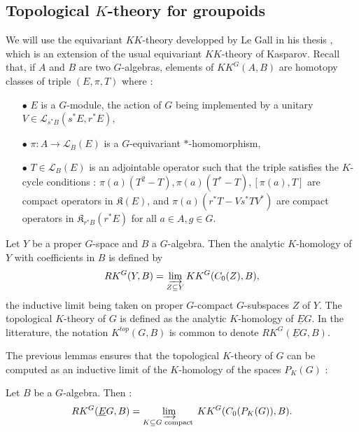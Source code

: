 \subsection{Topological $K$-theory for groupoids}

We will use the equivariant $KK$-theory developped by Le Gall in his thesis \cite{LeGall}, which is an extension of the usual equivariant $KK$-theory of Kasparov. Recall that, if $A$ and $B$ are two $G$-algebras, elements of $KK^G(A,B)$ are homotopy classes of triple $(E,\pi,T)$ where :\\

\begin{itemize}
\item[$\bullet$] $E$ is a $G$-module, the action of $G$ being implemented by a unitary $V\in\mathcal L_{s^* B}(s^* E, r^* E)$,
\item[$\bullet$] $\pi : A\rightarrow \mathcal L_B(E)$ is a $G$-equivariant $*$-homomorphism,
\item[$\bullet$] $T\in \mathcal L_B(E)$ is an adjointable operator such that the triple satisfies the $K$-cycle conditions : $\pi(a)(T^2-T),\pi(a)(T^*-T),[\pi(a),T]$ are compact operators in $\mathfrak K(E)$, and $\pi(a)(r^*T-V s^*T V^*)$ are compact operators in $\mathfrak K_{r^* B}(r^* E)$ for all $a\in A, g\in G$.\\
\end{itemize}

\begin{definition}
Let $Y$ be a proper $G$-space and $B$ a $G$-algebra. Then the analytic $K$-homology of $Y$ with coefficients in $B$ is defined by 
\[RK^G(Y,B) = \varinjlim_{Z\subseteq Y} KK^G(C_0(Z),B), \]
the inductive limit being taken on proper $G$-compact $G$-subspaces $Z$ of $Y$. The topological $K$-theory of $G$ is defined as the analytic $K$-homology of $\underline E G$. In the litterature, the notation $K^{top}(G,B)$ is common to denote $RK^G(\underline E G,B)$.
\end{definition}

The previous lemmas ensures that the topological $K$-theory of $G$ can be computed as an inductive limit of the $K$-homology of the spaces $P_K(G)$ :
\begin{lem}\label{Khomology} Let $B$ be a $G$-algebra. Then :
\[RK^G(\underline E G,B) = \varinjlim_{K\subseteq G \text{ compact }} KK^G(C_0(P_K(G)),B).\]
\end{lem}

